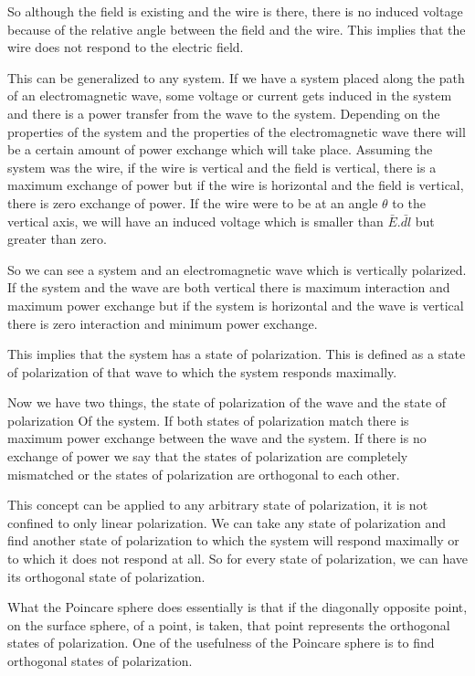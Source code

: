 So although the field is existing and the wire is there, there is no induced voltage because of the relative angle between the field and the wire. This implies that the wire does not respond to the electric field.

This can be generalized to any system. If we have a system placed along the path of an electromagnetic wave, some voltage or current gets induced in the system and there is a power transfer from the wave to the system. Depending on the properties of the system and the properties of the electromagnetic wave there will be a certain amount of power exchange which will take place. Assuming the system was the wire, if the wire is vertical and the field is vertical, there is a maximum exchange of power but if the wire is horizontal and the field is vertical, there is zero exchange of power. If the wire were to be at an angle $\theta$ to the vertical axis, we will have an induced voltage which is smaller than $\bar{E}$.$\bar{dl}$ but greater than zero.

So we can see a system and an electromagnetic wave which is vertically polarized. If the system and the wave are both vertical there is maximum interaction and maximum power exchange but if the system is horizontal and the wave is vertical there is zero interaction and minimum power exchange.

This implies that the system has a state of polarization. This is defined as a state of polarization of that wave to which the system responds maximally.

Now we have two things, the state of polarization of the wave and the state of polarization Of the system. If both states of polarization match there is maximum power exchange between the wave and the system. If there is no exchange of power we say that the states of polarization are completely mismatched or the states of polarization are orthogonal to each other.

This concept can be applied to any arbitrary state of polarization, it is not confined to only linear polarization. We can take any state of polarization and find another state of polarization to which the system will respond maximally or to which it does not respond at all. So for every state of polarization, we can have its orthogonal state of polarization. 

What the Poincare sphere does essentially is that if the diagonally opposite point, on the surface sphere, of a point, is taken, that point represents the orthogonal states of polarization. One of the usefulness of the Poincare sphere is to find orthogonal states of polarization.

